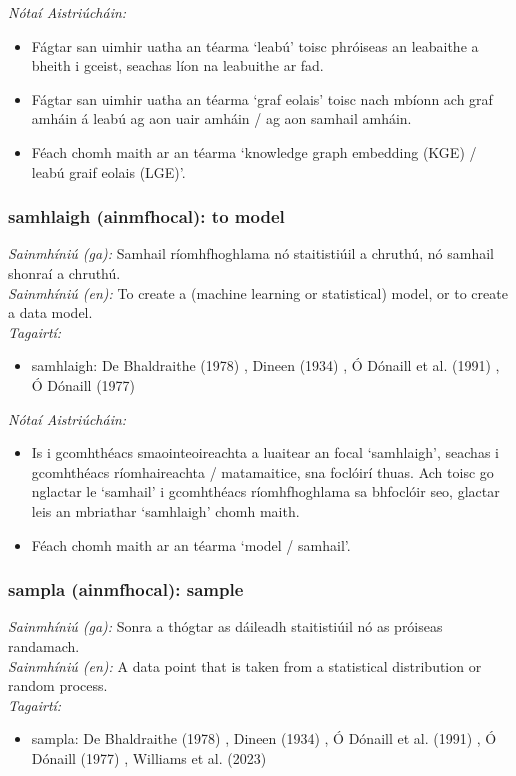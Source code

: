  \noindent \textit{Nótaí Aistriúcháin:}
\begin{itemize}
	\item Fágtar san uimhir uatha an téarma `leabú' toisc phróiseas an leabaithe a bheith i gceist, seachas líon na leabuithe ar fad.
	\item Fágtar san uimhir uatha an téarma `graf eolais' toisc nach mbíonn ach graf amháin á leabú ag aon uair amháin / ag aon samhail amháin.
	\item Féach chomh maith ar an téarma `knowledge graph embedding (KGE) / leabú graif eolais (LGE)'.
\end{itemize}


\subsubsection*{samhlaigh (ainmfhocal): to model}
 \noindent \textit{Sainmhíniú (ga):} Samhail ríomhfhoghlama nó staitistiúil a chruthú, nó samhail shonraí a chruthú.
\\
 \noindent \textit{Sainmhíniú (en):} To create a (machine learning or statistical) model, or to create a data model.
\\
 \noindent \textit{Tagairtí:}
\begin{itemize}
	\item samhlaigh: De Bhaldraithe (1978) \cite{de-bhaldraithe}, Dineen (1934) \cite{dineen}, Ó Dónaill et al. (1991) \cite{focloir-beag}, Ó Dónaill (1977) \cite{odonaill}
\end{itemize}

 \noindent \textit{Nótaí Aistriúcháin:}
\begin{itemize}
	\item Is i gcomhthéacs smaointeoireachta a luaitear an focal `samhlaigh', seachas i gcomhthéacs ríomhaireachta / matamaitice, sna foclóirí thuas. Ach toisc go nglactar le `samhail' i gcomhthéacs ríomhfhoghlama sa bhfoclóir seo, glactar leis an mbriathar `samhlaigh' chomh maith.
	\item Féach chomh maith ar an téarma `model / samhail'.
\end{itemize}


\subsubsection*{sampla (ainmfhocal): sample}
 \noindent \textit{Sainmhíniú (ga):} Sonra a thógtar as dáileadh staitistiúil nó as próiseas randamach.
\\
 \noindent \textit{Sainmhíniú (en):} A data point that is taken from a statistical distribution or random process.
\\
 \noindent \textit{Tagairtí:}
\begin{itemize}
	\item sampla: De Bhaldraithe (1978) \cite{de-bhaldraithe}, Dineen (1934) \cite{dineen}, Ó Dónaill et al. (1991) \cite{focloir-beag}, Ó Dónaill (1977) \cite{odonaill}, Williams et al. (2023) \cite{storchiste}
\end{itemize}

